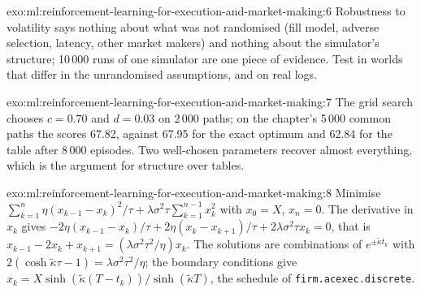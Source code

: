 \begin{solution}{exo:ml:reinforcement-learning-for-execution-and-market-making:6}
Robustness to volatility says nothing about what was not randomised (fill model, adverse selection, latency, other market
makers) and nothing about the simulator's structure; 10\,000 runs of one simulator are one piece of evidence. Test in worlds
that differ in the unrandomised assumptions, and on real logs.
\end{solution}

\begin{solution}{exo:ml:reinforcement-learning-for-execution-and-market-making:7}
The grid search chooses $c = 0.70$ and $d = 0.03$ on 2\,000 paths; on the chapter's 5\,000 common paths the  scores
67.82, against 67.95 for the exact optimum and 62.84 for the table after 8\,000 episodes. Two well-chosen parameters recover
almost everything, which is the argument for structure over tables.
\end{solution}

\begin{solution}{exo:ml:reinforcement-learning-for-execution-and-market-making:8}
Minimise $\sum_{k=1}^n\eta(x_{k-1} - x_k)^2/\tau + \lambda\sigma^2\tau\sum_{k=1}^{n-1}x_k^2$ with $x_0 = X$, $x_n = 0$. The
derivative in $x_k$ gives $-2\eta(x_{k-1} - x_k)/\tau + 2\eta(x_k - x_{k+1})/\tau + 2\lambda\sigma^2\tau x_k = 0$, that is
$x_{k-1} - 2x_k + x_{k+1} = (\lambda\sigma^2\tau^2/\eta)x_k$. The solutions are combinations of $e^{\pm\tilde\kappa t_k}$ with
$2(\cosh\tilde\kappa\tau - 1) = \lambda\sigma^2\tau^2/\eta$; the boundary conditions give $x_k = X\sinh(\tilde\kappa(T -
t_k))/\sinh(\tilde\kappa T)$, the schedule of \texttt{firm.acexec.discrete}.
\end{solution}

